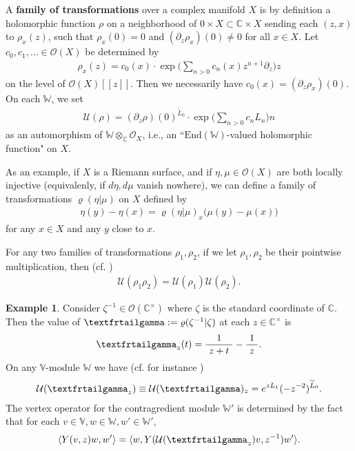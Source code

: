 \documentclass[12pt,a4paper,notitlepage]{article}
\theoremstyle{definition}
\newtheorem{eg}[df]{Example}
\theoremstyle{plain}
\newcommand{\mc}{\mathcal}
\newcommand{\wtd}{\widetilde}
\newcommand{\End}{\mathrm{End}} %
\newcommand{\bk}[1]{\langle {#1}\rangle}
\newcommand{\scr}{\mathscr}
\newcommand{\Vbb}{\mathbb V}
\newcommand{\Wbb}{\mathbb W}
\newcommand{\Cbb}{\mathbb C}
\newcommand{\tipxgamma}{\text{\textfrtailgamma}}
\numberwithin{equation}{subsection}
\begin{document}
A \textbf{family of transformations} over a complex manifold $X$ is by definition a holomorphic function $\rho$ on a neighborhood of $0\times X\subset \Cbb\times X$ sending each $(z,x)$ to $\rho_x(z)$, such that $\rho_x(0)=0$ and $(\partial_z\rho_x)(0)\neq 0$ for all $x\in X$. Let $c_0,c_1,\dots\in\scr O(X)$ be determined by
\begin{align*}
	\rho_x(z)=c_0(x)\cdot\exp\Big(\sum_{n>0}c_n(x)z^{n+1}\partial_z\Big)z
\end{align*}
on the level of $\scr O(X)[[z]]$. Then we necessarily have $c_0(x)=(\partial_z\rho_x)(0)$. On each $\Wbb$,   we set \index{U@$\mc U(\rho)$}
\begin{align*}
	\mc U(\rho)=(\partial_z\rho)(0)^{\wtd L_0}\cdot\exp\Big(\sum_{n>0}c_nL_n\Big)n
\end{align*}
as an automorphism of $\Wbb\otimes_\Cbb\scr O_X$, i.e., an ``$\End(\Wbb)$-valued holomorphic function" on $X$.


As an example, if $X$ is a Riemann surface, and if $\eta,\mu\in\scr O(X)$ are both locally injective (equivalenly, if $d\eta,d\mu$ vanish nowhere), we can define a family of transformations $\varrho(\eta|\mu)$  on $X$ defined by
\begin{align}
\eta(y)-\eta(x)=\varrho(\eta|\mu)_x\Big(\mu(y)-\mu(x)\Big)	
\end{align}
for any $x\in X$ and any $y$ close to $x$.

For any two families of transformations $\rho_1,\rho_2$, if we let $\rho_1,\rho_2$ be their pointwise multiplication, then (cf. \cite[Sec. 4.2]{Hua97})
\begin{align*}
\mc U(\rho_1\rho_2)=\mc U(\rho_1)\mc U(\rho_2).	
\end{align*}

\begin{eg}\label{lb36}
Consider $\zeta^{-1}\in\scr O(\Cbb^\times)$ where $\zeta$ is the standard coordinate of $\Cbb$. Then the value of $\tipxgamma:=\varrho(\zeta^{-1}|\zeta)$ at each $z\in\Cbb^\times$ is \index{zz@$\tipxgamma$}
\begin{align*}
\tipxgamma_z(t)=\frac 1{~z+t~}-\frac 1{~z~}.	
\end{align*}
On any $\Vbb$-module $\Wbb$ we have (cf. for instance \cite[Ex. 1.4]{Gui20b})
\begin{align}
\mc U(\tipxgamma_z)\equiv\mc U(\tipxgamma)_z=e^{z L_1}(-z^{-2})^{\wtd L_0}.	
\end{align}
The vertex operator for the contragredient module $\Wbb'$ is determined by the fact that for each $v\in\Vbb,w\in\Wbb,w'\in\Wbb'$,
\begin{align*}
\bk{Y(v,z)w,w'}=\bk{w,Y(\mc U(\tipxgamma_z)v,z^{-1})w'}.
\end{align*}
\end{eg}
\end{document}
